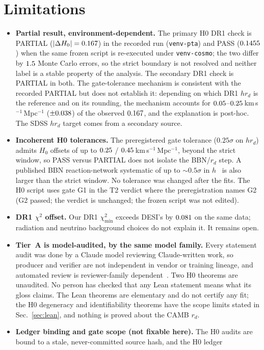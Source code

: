 \documentclass[11pt]{article}
\newcommand{\kms}{km\,s$^{-1}$\,Mpc$^{-1}$}
\begin{document}
\section{Limitations}\label{sec:limits}
\begin{itemize}
\item \textbf{Partial result, environment-dependent.} The primary H0 DR1 check is PARTIAL ($|\Delta H_0|=0.167$) in the recorded run (\texttt{venv-pta}) and PASS
($0.1455$) when the same frozen script is re-executed under \texttt{venv-cosmo}; the two differ by $1.5$ Monte Carlo errors, so the strict boundary is not resolved and
neither label is a stable property of the analysis. The secondary DR1 check is PARTIAL in both. The gate-tolerance mechanism is consistent with the recorded PARTIAL but does not establish it: depending on which DR1 $hr_d$
is the reference and on its rounding, the mechanism accounts for $0.05$--$0.25$\,\kms{} ($\pm0.038$) of the observed $0.167$, and the explanation is post-hoc. The SDSS $hr_d$ target comes
from a secondary source.
\item \textbf{Incoherent H0 tolerances.} The preregistered gate tolerance ($0.25\sigma$ on $hr_d$) admits $H_0$ offsets of up to $0.25$ / $0.45$\,\kms{},
beyond the strict window, so PASS versus PARTIAL does not isolate the BBN/$r_d$ step. A published BBN reaction-network systematic of up to $\sim0.5\sigma$ in $h$~\cite{akharman2026}
is also larger than the strict window. No tolerance was changed after the fits. The H0 script uses gate G1
in the T2 verdict where the preregistration names G2 (G2 passed; the verdict is unchanged; the frozen script was not edited).
\item \textbf{DR1 $\chi^2$ offset.} Our DR1 $\chi^2_{\min}$ exceeds DESI's by $0.081$ on the same data; radiation and neutrino background choices do
not explain it. It remains open.
\item \textbf{Tier~A is model-audited, by the same model family.} Every statement audit was done by a Claude model reviewing Claude-written work, so producer and
verifier are not independent in vendor or training lineage, and automated review is reviewer-family dependent~\cite{ravideshik2026}. Two H0 theorems are unaudited. No person has checked
that any Lean statement means what its gloss claims. The Lean theorems are elementary and do not certify any fit; the H0 degeneracy and
identifiability theorems have the scope limits stated in Sec.~\ref{sec:lean}, and nothing is proved about the CAMB $r_d$.
\item \textbf{Ledger binding and gate scope (not fixable here).} The H0 audits are bound to a stale, never-committed source hash, and the H0 ledger

\end{itemize}
\end{document}

